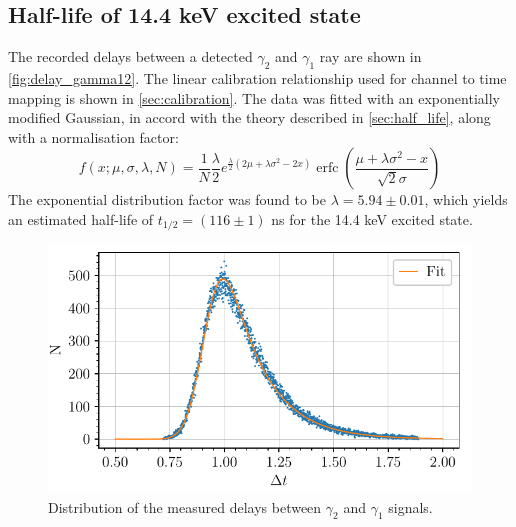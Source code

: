 \subsection{Half-life of 14.4 keV excited state}

The recorded delays between a detected \(\gamma_2\) and \(\gamma_1\) ray are shown in \autoref{fig:delay_gamma12}. The linear calibration relationship used for channel to time mapping is shown in \autoref{sec:calibration}. The data was fitted with an exponentially modified Gaussian, in accord with the theory described in \autoref{sec:half_life}, along with a normalisation factor:
\begin{equation}
    f(x;\mu,\sigma,\lambda, N) = \frac{1}{N} \frac{\lambda}{2} e^{\frac{\lambda}{2} (2 \mu + \lambda \sigma^2 - 2 x)}
             \operatorname{erfc} \left(\frac{\mu + \lambda \sigma^2 - x}{ \sqrt{2} \sigma}\right)
\end{equation}
The exponential distribution factor was found to be \(\lambda = 5.94 \pm 0.01\), which yields an estimated half-life of \(t_{1/2} = (116 \pm 1)\) ns for the 14.4 keV excited state.

\begin{figure}[h]
    \centering
    \includegraphics[scale=1]{figures/co57_halflife.pdf}    
    \caption{Distribution of the measured delays between \(\gamma_2\) and \(\gamma_1\) signals.}
    \label{fig:delay_gamma12}
\end{figure}


